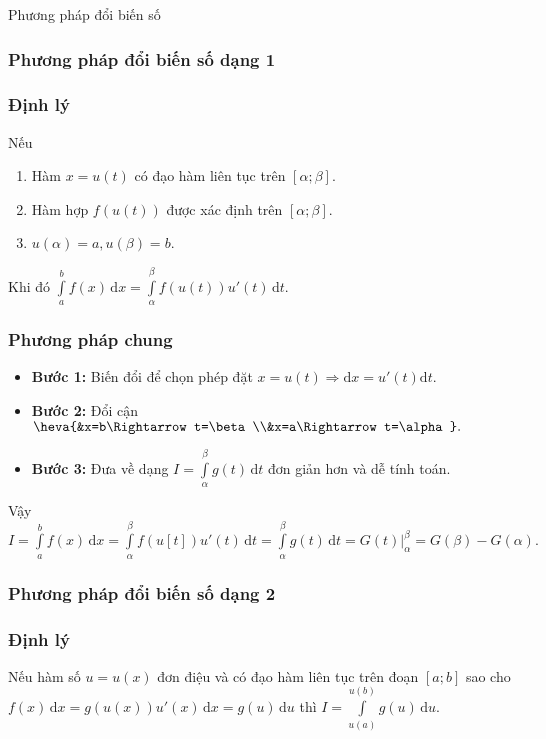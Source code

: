 \begin{dang}{Phương pháp đổi biến số}
\subsubsection{Phương pháp đổi biến số dạng 1}
\subsubsection*{Định lý}
Nếu 
\begin{enumerate}
	\item Hàm $x = u(t)$ có đạo hàm liên tục trên $[\alpha; \beta]$.
	\item Hàm hợp $f(u(t))$ được xác định trên $[\alpha; \beta]$.
	\item $u(\alpha) = a, u(\beta) = b$.
\end{enumerate}
Khi đó $\displaystyle\int\limits_a^bf(x)\mathrm{\,d}x = \displaystyle\int\limits_\alpha^\beta f(u(t))u'(t)\mathrm{\,d}t.$
\subsubsection*{Phương pháp chung}
\begin{itemize}
	\item \textbf{Bước 1:} Biến đổi để chọn phép đặt $x=u(t)\Rightarrow\mathrm{d}x=u'(t)\mathrm{d}t$.
	\item \textbf{Bước 2:} Đổi cận $\heva{&x=b\Rightarrow t=\beta\\&x=a\Rightarrow t=\alpha}.$
	\item\textbf{Bước 3:} Đưa về dạng $I=\displaystyle\int\limits_{\alpha}^{\beta} g(t)\mathrm{\,d}t$ đơn giản hơn và dễ tính toán.
\end{itemize}
Vậy  $I = \displaystyle\int\limits_a^bf(x)\mathrm{\,d}x = \displaystyle\int\limits_\alpha^\beta f(u[t])u'(t)\mathrm{\,d}t= 	\displaystyle\int\limits_\alpha^\beta g(t)\mathrm{\,d}t=	\left.G(t)\right|_\alpha^\beta=G(\beta)-G(\alpha).$	
\subsubsection{Phương pháp đổi biến số dạng 2}
\subsubsection*{Định lý}
Nếu hàm số $u=u(x)$ đơn điệu và có đạo hàm liên tục trên đoạn $\left[a;b\right]$ sao cho $f(x)\,\mathrm{d}x=g\left(u(x)\right)u'(x)\,\mathrm{d}x=g(u)\,\mathrm{d}u$ thì $I=\displaystyle\int\limits_{u(a)}^{u(b)}g(u)\,\mathrm{d}u$.

\end{dang}

